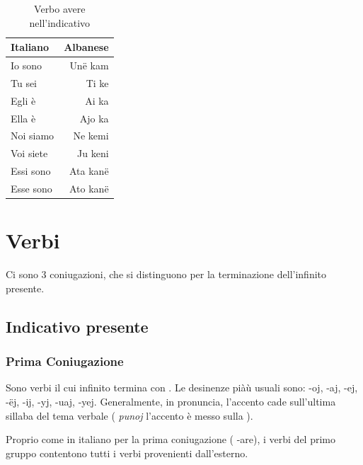 \begin{table}[H]
    \centering
    \begin{tabular}{lr}
        \toprule
        Italiano    &   Albanese \\
        \midrule
        Io sono & Unë kam \\
        Tu sei & Ti ke\\
        Egli è & Ai ka\\
        Ella è & Ajo ka\\
        Noi siamo & Ne kemi \\
        Voi siete & Ju keni \\
        Essi sono & Ata kanë \\
        Esse sono & Ato kanë \\
        \bottomrule
    \end{tabular}
    \caption{Verbo avere nell'indicativo}
\end{table}

\section{Verbi}

Ci sono 3 coniugazioni, che si distinguono per la terminazione dell'infinito presente.

\subsection{Indicativo presente}

\subsubsection{Prima Coniugazione}

Sono verbi il cui infinito termina con . Le desinenze piàù usuali sono: -oj, -aj, -ej, -ëj, -ij, -yj, -uaj, -yej. Generalmente, in pronuncia, l'accento cade sull'ultima sillaba del tema verbale (\eg{} \textit{punoj} l'accento è messo sulla )\cite{vocedellaquila:verbiprimogruppo, viola:verbiprimogruppo}.

\begin{note}
Proprio come in italiano per la prima coniugazione (\ie{} -are), i verbi del primo gruppo contentono tutti i verbi provenienti dall'esterno\cite{vocedellaquila:verbiprimogruppo}.
\end{note}

